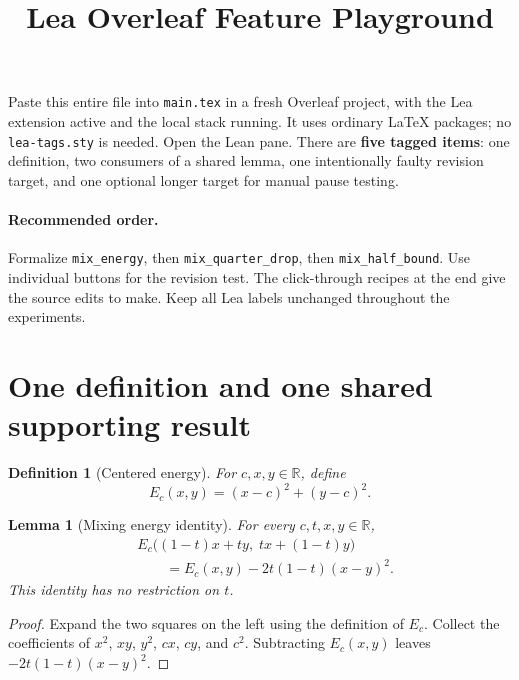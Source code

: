 \documentclass[11pt]{article}
\title{Lea Overleaf Feature Playground}
\author{}
\date{}
\newtheorem{definition}{Definition}
\newtheorem{lemma}{Lemma}
\newcommand{\code}[1]{\texttt{#1}}
\begin{document}
\maketitle

\noindent Paste this entire file into \code{main.tex} in a fresh Overleaf
project, with the Lea extension active and the local stack running.
It uses ordinary LaTeX packages; no \code{lea-tags.sty} is needed.
Open the Lean pane. There are \textbf{five tagged items}: one definition,
two consumers of a shared lemma, one intentionally faulty revision target,
and one optional longer target for manual pause testing.

\paragraph{Recommended order.}
Formalize \code{mix\_energy}, then \code{mix\_quarter\_drop}, then
\code{mix\_half\_bound}. Use individual buttons for the revision test.
The click-through recipes at the end give the source edits to make.
Keep all Lea labels unchanged throughout the experiments.

\section{One definition and one shared supporting result}

\begin{definition}[Centered energy]\label{def:mix-energy}
For $c,x,y\in\mathbb{R}$, define
\[
  E_c(x,y)=(x-c)^2+(y-c)^2.
\]
\end{definition}

\begin{lemma}[Mixing energy identity]\label{lem:mixing-energy-step}
For every $c,t,x,y\in\mathbb{R}$,
\begin{align*}
  &E_c\bigl((1-t)x+ty,\;tx+(1-t)y\bigr)\\
  &\qquad=E_c(x,y)-2t(1-t)(x-y)^2.
\end{align*}
This identity has \emph{no restriction} on $t$.
\end{lemma}
\begin{proof}
Expand the two squares on the left using the definition of $E_c$.
Collect the coefficients of $x^2$, $xy$, $y^2$, $cx$, $cy$, and $c^2$.
Subtracting $E_c(x,y)$ leaves $-2t(1-t)(x-y)^2$.
\end{proof}
\end{document}
